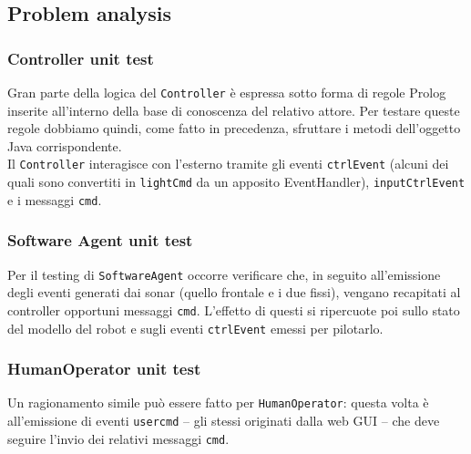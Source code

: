 \documentclass{../llncs}
\newcommand{\codescript}[1]{{\mbox{\small{\texttt{#1}}}}\xspace}
\begin{document}


\subsection{Problem analysis}

\subsubsection{Controller unit test}
Gran parte della logica del \texttt{Controller} è espressa sotto forma di regole Prolog inserite all'interno della base di conoscenza del relativo attore. Per testare queste regole dobbiamo quindi, come fatto in precedenza, sfruttare i metodi dell'oggetto Java corrispondente.\\



Il \texttt{Controller} interagisce con l'esterno tramite gli eventi \codescript{ctrlEvent} (alcuni dei quali sono convertiti in \codescript{lightCmd} da un apposito EventHandler), \codescript{inputCtrlEvent} e i messaggi \codescript{cmd}.\\



\subsubsection{Software Agent unit test}
Per il testing di \texttt{SoftwareAgent} occorre verificare che, in seguito all'emissione degli eventi generati dai sonar (quello frontale e i due fissi), vengano recapitati al controller opportuni messaggi \codescript{cmd}. L'effetto di questi si ripercuote poi sullo stato del modello del robot e sugli eventi \codescript{ctrlEvent} emessi per pilotarlo.\\



\subsubsection{HumanOperator unit test}
Un ragionamento simile può essere fatto per \texttt{HumanOperator}: questa volta è all'emissione di eventi \codescript{usercmd} -- gli stessi originati dalla web GUI -- che deve seguire l'invio dei relativi messaggi \codescript{cmd}.\\
\end{document}
